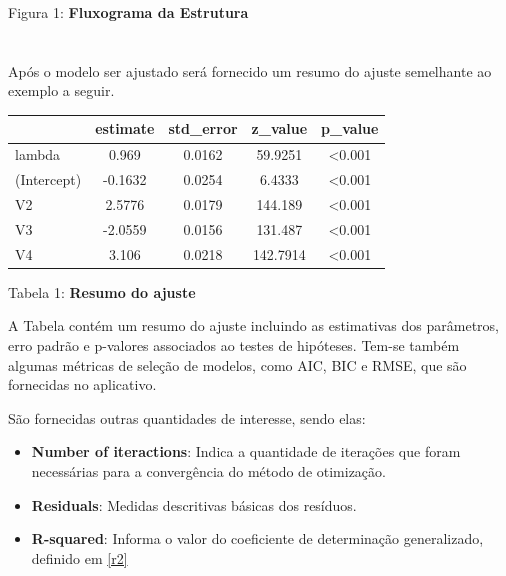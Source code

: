\documentclass{sciposter}
\begin{document}
\begin{multicols*}{2}
{\centerline{Figura 1: \textbf{ Fluxograma da Estrutura}}







\section*{}
\vspace{0.2cm}

Após o  modelo ser ajustado será fornecido um resumo do ajuste semelhante ao exemplo a seguir.


\vspace{0.2cm}

\begin{table}
\centering
\begin{tabular}{l| c | c | c | c}
\hline
\rowcolor{lightgray!40}
  & estimate & std\_error & z\_value & p\_value\\
\hline
lambda & 0.969 & 0.0162 & 59.9251 & <0.001\\
\hline
(Intercept) & -0.1632 & 0.0254 & 6.4333 & <0.001\\
\hline
V2 & 2.5776 & 0.0179 & 144.189 & <0.001\\
\hline
V3 & -2.0559 & 0.0156 & 131.487 & <0.001\\
\hline
V4 & 3.106 & 0.0218 & 142.7914 & <0.001\\
\hline
\end{tabular}
\end{table}

\centerline{Tabela 1: \textbf{ Resumo do ajuste}}
\vspace{0.3cm}

A Tabela contém um resumo do ajuste incluindo as estimativas dos parâmetros, erro padrão e p-valores associados ao testes de hipóteses. Tem-se também algumas métricas de seleção de modelos, como AIC, BIC e RMSE, que são fornecidas no aplicativo.
\vspace{0.2cm}

São fornecidas outras quantidades de interesse, sendo elas:
\begin{itemize}
\item \textbf{Number of iteractions}: Indica a quantidade de iterações que foram necessárias para a convergência do método de otimização.
\item \textbf{Residuals}: Medidas descritivas básicas dos resíduos.
\item \textbf{R-squared}: Informa o valor do coeficiente de determinação generalizado, definido em \eqref{r2}


\end{itemize}}
\end{multicols*}
\end{document}
